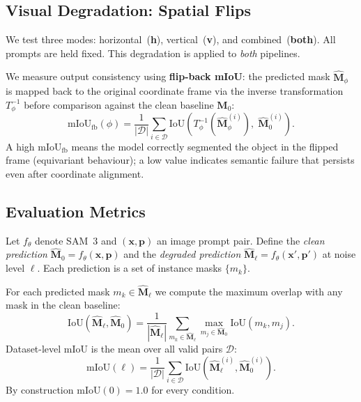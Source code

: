 \documentclass[10pt,twocolumn,letterpaper]{article}
\begin{document}
\subsection{Visual Degradation: Spatial Flips}
\label{sec:flips}
We test three modes: horizontal~(\textbf{h}), vertical~(\textbf{v}), and combined~(\textbf{both}). All prompts are held fixed. This degradation is applied to \emph{both} pipelines.


  We measure output consistency using \textbf{flip-back mIoU}: the predicted
  mask $\hat{\mathbf{M}}_\phi$ is mapped back to the original coordinate frame
  via the inverse transformation $T_\phi^{-1}$ before comparison against the
  clean baseline $\hat{\mathbf{M}}_0$:
  \begin{equation}
    \mathrm{mIoU}_{\mathrm{fb}}(\phi)
    = \frac{1}{|\mathcal{D}|}
      \sum_{i \in \mathcal{D}}
      \mathrm{IoU}(T_\phi^{-1}(\hat{\mathbf{M}}_\phi^{(i)}),\;\hat{\mathbf{M}}_0^{(i)}).
    \label{eq:flipback}
  \end{equation}
  A high $\mathrm{mIoU}_{\mathrm{fb}}$ means the model correctly segmented
  the object in the flipped frame (equivariant behaviour); a low value
  indicates semantic failure that persists even after coordinate alignment.
\subsection{Evaluation Metrics}

Let $f_\theta$ denote SAM~3 and $(\mathbf{x}, \mathbf{p})$ an image prompt
pair.  Define the \emph{clean prediction}
$\hat{\mathbf{M}}_0 = f_\theta(\mathbf{x}, \mathbf{p})$ and the \emph{degraded prediction}
$\hat{\mathbf{M}}_\ell = f_\theta(\mathbf{x}', \mathbf{p}')$ at noise level $\ell$.  Each prediction is a set of instance masks $\{m_k\}$.


For each predicted mask $m_k \in \hat{\mathbf{M}}_\ell$ we compute the maximum
overlap with any mask in the clean baseline:
%
\begin{equation}
  \mathrm{IoU}(\hat{\mathbf{M}}_\ell,\hat{\mathbf{M}}_0)
  = \frac{1}{|\hat{\mathbf{M}}_\ell|}
    \sum_{m_k \in \hat{\mathbf{M}}_\ell}
    \max_{m_j \in \hat{\mathbf{M}}_0} \mathrm{IoU}(m_k, m_j).
  \label{eq:miou-instance}
\end{equation}
%
Dataset-level mIoU is the mean over all valid pairs $\mathcal{D}$:
%
\begin{equation}
  \mathrm{mIoU}(\ell)
  = \frac{1}{|\mathcal{D}|}
    \sum_{i \in \mathcal{D}}
    \mathrm{IoU}(\hat{\mathbf{M}}_\ell^{(i)}, \hat{\mathbf{M}}_0^{(i)}).
  \label{eq:miou-dataset}
\end{equation}
%
By construction $\mathrm{mIoU}(0) = 1.0$ for every condition.
\end{document}
